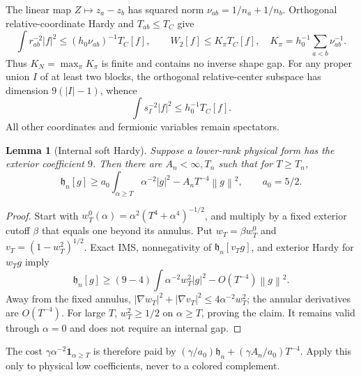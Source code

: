 \documentclass[11pt,letterpaper]{article}
\newtheorem{lemma}[theorem]{Lemma}
\theoremstyle{definition}\newtheorem{hypothesis}[theorem]{Hypothesis}
\newcommand{\hh}{\mathfrak h}
\newcommand{\norm}[1]{\left\lVert #1\right\rVert}
\numberwithin{equation}{section}
\begin{document}
The linear map $Z\mapsto z_a-z_b$ has squared norm $\nu_{ab}=1/n_a+1/n_b$. Orthogonal relative-coordinate Hardy and $T_{ab}\le T_C$ give
\begin{equation}
 \int r_{ab}^{-2}|f|^2\le (h_0\nu_{ab})^{-1}T_C[f],
 \qquad W_2[f]\le K_\pi T_C[f],\quad
 K_\pi=h_0^{-1}\sum_{a<b}\nu_{ab}^{-1}.\label{eq:rootpayment}
\end{equation}
Thus $K_N=\max_\pi K_\pi$ is finite and contains no inverse shape gap. For any proper union $I$ of at least two blocks, the orthogonal relative-center subspace has dimension $9(|I|-1)$, whence
\begin{equation}
 \int s_I^{-2}|f|^2\le h_0^{-1}T_C[f].\label{eq:unionpayment}
\end{equation}
All other coordinates and fermionic variables remain spectators.

\begin{lemma}[Internal soft Hardy]\label{lem:soft}
Suppose a lower-rank physical form has the exterior coefficient $9$. Then there are $A_n<\infty,T_n$ such that for $T\ge T_n$,
\begin{equation}
 \hh_n[g]\ge a_0\int_{\alpha\ge T}\alpha^{-2}|g|^2
                  -A_nT^{-4}\norm{g}^2,\qquad a_0=5/2.\label{eq:soft}
\end{equation}
\end{lemma}
\begin{proof}
Start with $w_T^0(\alpha)=\alpha^2(T^4+\alpha^4)^{-1/2}$, and multiply by a fixed exterior cutoff $\beta$ that equals one beyond its annulus. Put $w_T=\beta w_T^0$ and $v_T=(1-w_T^2)^{1/2}$. Exact IMS, nonnegativity of $\hh_n[v_Tg]$, and exterior Hardy for $w_Tg$ imply
\begin{equation}
 \hh_n[g]\ge(9-4)\int\alpha^{-2}w_T^2|g|^2-O(T^{-4})\norm{g}^2.
\end{equation}
Away from the fixed annulus,
$|\nabla w_T|^2+|\nabla v_T|^2\le4\alpha^{-2}w_T^2$;
the annular derivatives are $O(T^{-4})$. For large $T$, $w_T^2\ge1/2$ on $\alpha\ge T$, proving the claim. It remains valid through $\alpha=0$ and does not require an internal gap.
\end{proof}
The cost $\gamma\alpha^{-2}\mathbf1_{\alpha\ge T}$ is therefore paid by $(\gamma/a_0)\hh_n+(\gamma A_n/a_0)T^{-4}$. Apply this only to physical low coefficients, never to a colored complement.
\end{document}
